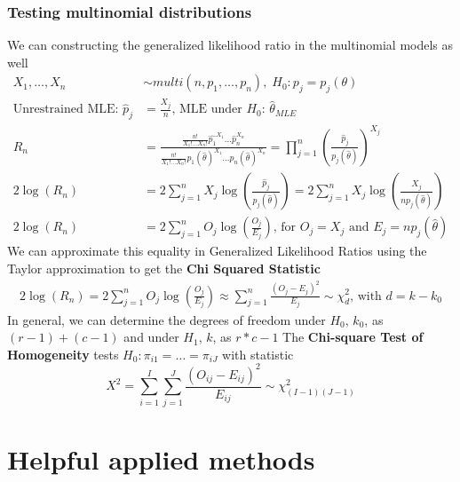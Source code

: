 \documentclass{article}
\begin{document}
\subsubsection{Testing multinomial distributions}
We can constructing the generalized likelihood ratio in the multinomial models as well
\begin{align*}
    X_1, \dots, X_n &\sim multi(n, p_1, \dots, p_n), \; H_0: p_j = p_j(\theta)
    \\
    \textrm{Unrestrained MLE: } \hat{p}_j &= \frac{X_j}{n} \textrm{, MLE under $H_0$: } \hat{\theta}_{MLE}\\
    R_n &= \frac{\frac{n!}{X_1!\dots X_n!}\hat{p_1}^{X_1}\dots\hat{p}_n^{X_n}}{\frac{n!}{X_1!\dots X_n!}p_1(\hat{\theta})^{X_1} \dots p_n(\hat{\theta})^{X_n}} = \prod_{j=1}^n \left(\frac{\hat{p}_j}{p_j(\hat{\theta})} \right)^{X_j}\\
    2\log(R_n) &= 2 \sum_{j=1}^n X_j\log\left(\frac{\hat{p}_j}{p_j(\hat{\theta})} \right) = 2 \sum_{j=1}^n X_j\log\left(\frac{X_j}{np_j(\hat{\theta})}\right)\\
    2\log(R_n) &= 2\sum_{j=1}^nO_j\log\left(\frac{O_j}{E_j}\right) \textrm{, for } O_j=X_j \textrm{ and } E_j = np_j(\hat{\theta})
\end{align*}
We can approximate this equality in Generalized Likelihood Ratios using the Taylor approximation to get the \textbf{Chi Squared Statistic}
\begin{align*}
    2\log(R_n) = 2\sum_{j=1}^nO_j\log\left(\frac{O_j}{E_j}\right) \approx \sum_{j=1}^n \frac{(O_j-E_j)^2}{E_j} \sim \chi^2_d \textrm{, with } d = k - k_0
\end{align*}
In general, we can determine the degrees of freedom under $H_0$, $k_0$, as $(r-1) + (c-1)$ and under $H_1$, $k$, as $r*c-1$
The \textbf{Chi-square Test of Homogeneity} tests $H_0: \pi_{i1} = \dots = \pi_{iJ}$ with statistic
\begin{equation*}
    X^2 = \sum_{i=1}^I \sum_{j=1}^J \frac{(O_{ij} - E_{ij})^2}{E_{ij}} \sim \chi^2_{(I-1)(J-1)}
\end{equation*}

\section{Helpful applied methods}
\end{document}
